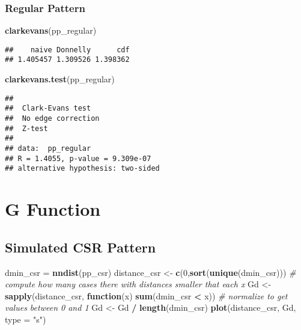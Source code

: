 \documentclass[
]{book}
\newenvironment{Shaded}{\begin{snugshade}}{\end{snugshade}}
\newcommand{\CommentTok}[1]{\textcolor[rgb]{0.56,0.35,0.01}{\textit{#1}}}
\newcommand{\ControlFlowTok}[1]{\textcolor[rgb]{0.13,0.29,0.53}{\textbf{#1}}}
\newcommand{\DataTypeTok}[1]{\textcolor[rgb]{0.13,0.29,0.53}{#1}}
\newcommand{\DecValTok}[1]{\textcolor[rgb]{0.00,0.00,0.81}{#1}}
\newcommand{\KeywordTok}[1]{\textcolor[rgb]{0.13,0.29,0.53}{\textbf{#1}}}
\newcommand{\NormalTok}[1]{#1}
\newcommand{\OperatorTok}[1]{\textcolor[rgb]{0.81,0.36,0.00}{\textbf{#1}}}
\newcommand{\StringTok}[1]{\textcolor[rgb]{0.31,0.60,0.02}{#1}}
\begin{document}
\hypertarget{regular-pattern-2}{%
\subsubsection{Regular Pattern}\label{regular-pattern-2}}

\begin{Shaded}
\begin{Highlighting}[]
\KeywordTok{clarkevans}\NormalTok{(pp_regular)}
\end{Highlighting}
\end{Shaded}

\begin{verbatim}
##    naive Donnelly      cdf 
## 1.405457 1.309526 1.398362
\end{verbatim}

\begin{Shaded}
\begin{Highlighting}[]
\KeywordTok{clarkevans.test}\NormalTok{(pp_regular)}
\end{Highlighting}
\end{Shaded}

\begin{verbatim}
## 
## 	Clark-Evans test
## 	No edge correction
## 	Z-test
## 
## data:  pp_regular
## R = 1.4055, p-value = 9.309e-07
## alternative hypothesis: two-sided
\end{verbatim}

\hypertarget{g-function}{%
\section{G Function}\label{g-function}}

\hypertarget{simulated-csr-pattern-2}{%
\subsection{Simulated CSR Pattern}\label{simulated-csr-pattern-2}}

\begin{Shaded}
\begin{Highlighting}[]
\NormalTok{dmin_csr =}\StringTok{ }\KeywordTok{nndist}\NormalTok{(pp_csr)}
\NormalTok{distance_csr <-}\StringTok{ }\KeywordTok{c}\NormalTok{(}\DecValTok{0}\NormalTok{,}\KeywordTok{sort}\NormalTok{(}\KeywordTok{unique}\NormalTok{(dmin_csr)))}
\CommentTok{# compute how many cases there with distances smaller that each x}
\NormalTok{Gd <-}\StringTok{ }\KeywordTok{sapply}\NormalTok{(distance_csr, }\ControlFlowTok{function}\NormalTok{(x) }\KeywordTok{sum}\NormalTok{(dmin_csr }\OperatorTok{<}\StringTok{ }\NormalTok{x))}
\CommentTok{# normalize to get values between 0 and 1}
\NormalTok{Gd <-}\StringTok{ }\NormalTok{Gd }\OperatorTok{/}\StringTok{ }\KeywordTok{length}\NormalTok{(dmin_csr)}
\KeywordTok{plot}\NormalTok{(distance_csr, Gd, }\DataTypeTok{type =} \StringTok{"s"}\NormalTok{)}
\end{Highlighting}
\end{Shaded}
\end{document}
